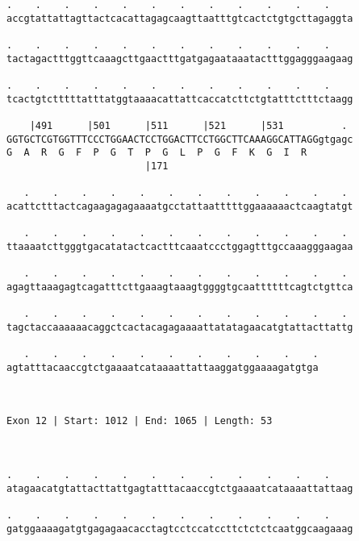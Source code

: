 \documentclass{article}
\begin{document}
\begin{Verbatim}
.    .    .    .    .    .    .    .    .    .    .    .    
accgtattattagttactcacattagagcaagttaatttgtcactctgtgcttagaggta
                                                            
.    .    .    .    .    .    .    .    .    .    .    .    
tactagactttggttcaaagcttgaactttgatgagaataaatactttggagggaagaag
                                                            
.    .    .    .    .    .    .    .    .    .    .    .    
tcactgtctttttatttatggtaaaacattattcaccatcttctgtatttctttctaagg
                                                            
    |491      |501      |511      |521      |531          . 
GGTGCTCGTGGTTTCCCTGGAACTCCTGGACTTCCTGGCTTCAAAGGCATTAGGgtgagc
G  A  R  G  F  P  G  T  P  G  L  P  G  F  K  G  I  R        
                        |171                                
  
   .    .    .    .    .    .    .    .    .    .    .    . 
acattctttactcagaagagagaaaatgcctattaatttttggaaaaaactcaagtatgt
                                                            
   .    .    .    .    .    .    .    .    .    .    .    . 
ttaaaatcttgggtgacatatactcactttcaaatccctggagtttgccaaagggaagaa
                                                            
   .    .    .    .    .    .    .    .    .    .    .    . 
agagttaaagagtcagatttcttgaaagtaaagtggggtgcaattttttcagtctgttca
                                                            
   .    .    .    .    .    .    .    .    .    .    .    . 
tagctaccaaaaaacaggctcactacagagaaaattatatagaacatgtattacttattg
                                                            
   .    .    .    .    .    .    .    .    .    .    .
agtatttacaaccgtctgaaaatcataaaattattaaggatggaaaagatgtga
                                                      
                                                      
 
Exon 12 | Start: 1012 | End: 1065 | Length: 53



.    .    .    .    .    .    .    .    .    .    .    .    
atagaacatgtattacttattgagtatttacaaccgtctgaaaatcataaaattattaag
                                                            
.    .    .    .    .    .    .    .    .    .    .    .    
gatggaaaagatgtgagagaacacctagtcctccatccttctctctcaatggcaagaaag
                                                            

\end{Verbatim}
\end{document}
